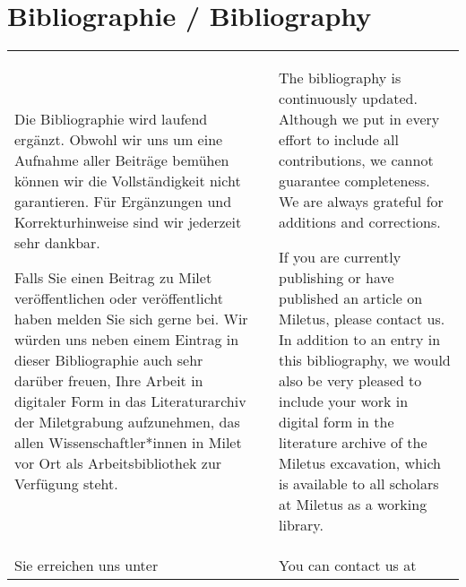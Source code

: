 
\chapter{Bibliographie / Bibliography}
\setcounter{page}{1}

\begin{tabular}[H!]{p{} c p{}}
    

Die Bibliographie wird laufend ergänzt. Obwohl wir uns um eine Aufnahme aller Beiträge bemühen können wir die Vollständigkeit nicht garantieren. Für Ergänzungen und Korrekturhinweise sind wir jederzeit sehr dankbar. 

Falls Sie einen Beitrag zu Milet veröffentlichen oder veröffentlicht haben melden Sie sich gerne bei. Wir würden uns neben einem Eintrag in dieser Bibliographie auch sehr darüber freuen, Ihre Arbeit in digitaler Form in das Literaturarchiv der Miletgrabung aufzunehmen, das allen Wissenschaftler*innen in Milet vor Ort als Arbeitsbibliothek zur Verfügung steht. 

&  &

The bibliography is continuously updated. Although we put in every effort to include all contributions, we cannot guarantee completeness. We are always grateful for additions and corrections. 

If you are currently publishing or have published an article on Miletus, please contact us. In addition to an entry in this bibliography, we would also be very pleased to include your work in digital form in the literature archive of the Miletus excavation, which is available to all scholars at Miletus as a working library.\\

Sie erreichen uns unter & & You can contact us at\\
\end{tabular}

\begin{center}%
\end{center}%